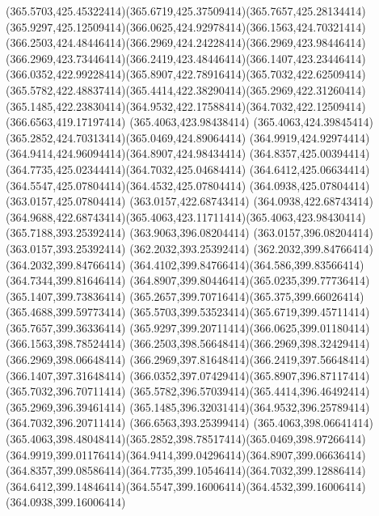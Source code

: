 {{	\curveto(365.5703,425.45322414)(365.6719,425.37509414)(365.7657,425.28134414)
	\curveto(365.9297,425.12509414)(366.0625,424.92978414)(366.1563,424.70321414)
	\curveto(366.2503,424.48446414)(366.2969,424.24228414)(366.2969,423.98446414)
	\curveto(366.2969,423.73446414)(366.2419,423.48446414)(366.1407,423.23446414)
	\curveto(366.0352,422.99228414)(365.8907,422.78916414)(365.7032,422.62509414)
	\curveto(365.5782,422.48837414)(365.4414,422.38290414)(365.2969,422.31260414)
	\curveto(365.1485,422.23830414)(364.9532,422.17588414)(364.7032,422.12509414)
	\lineto(366.6563,419.17197414)
	\closepath
	\moveto(365.4063,423.98438414)
	\curveto(365.4063,424.39845414)(365.2852,424.70313414)(365.0469,424.89064414)
	\curveto(364.9919,424.92974414)(364.9414,424.96094414)(364.8907,424.98434414)
	\curveto(364.8357,425.00394414)(364.7735,425.02344414)(364.7032,425.04684414)
	\curveto(364.6412,425.06634414)(364.5547,425.07804414)(364.4532,425.07804414)
	\lineto(364.0938,425.07804414)
	\lineto(363.0157,425.07804414)
	\lineto(363.0157,422.68743414)
	\lineto(364.0938,422.68743414)
	\curveto(364.9688,422.68743414)(365.4063,423.11711414)(365.4063,423.98430414)
	\closepath
	\moveto(365.7188,393.25392414)
	\lineto(363.9063,396.08204414)
	\lineto(363.0157,396.08204414)
	\lineto(363.0157,393.25392414)
	\lineto(362.2032,393.25392414)
	\lineto(362.2032,399.84766414)
	\lineto(364.2032,399.84766414)
	\curveto(364.4102,399.84766414)(364.586,399.83566414)(364.7344,399.81646414)
	\curveto(364.8907,399.80446414)(365.0235,399.77736414)(365.1407,399.73836414)
	\curveto(365.2657,399.70716414)(365.375,399.66026414)(365.4688,399.59773414)
	\curveto(365.5703,399.53523414)(365.6719,399.45711414)(365.7657,399.36336414)
	\curveto(365.9297,399.20711414)(366.0625,399.01180414)(366.1563,398.78524414)
	\curveto(366.2503,398.56648414)(366.2969,398.32429414)(366.2969,398.06648414)
	\curveto(366.2969,397.81648414)(366.2419,397.56648414)(366.1407,397.31648414)
	\curveto(366.0352,397.07429414)(365.8907,396.87117414)(365.7032,396.70711414)
	\curveto(365.5782,396.57039414)(365.4414,396.46492414)(365.2969,396.39461414)
	\curveto(365.1485,396.32031414)(364.9532,396.25789414)(364.7032,396.20711414)
	\lineto(366.6563,393.25399414)
	\closepath
	\moveto(365.4063,398.06641414)
	\curveto(365.4063,398.48048414)(365.2852,398.78517414)(365.0469,398.97266414)
	\curveto(364.9919,399.01176414)(364.9414,399.04296414)(364.8907,399.06636414)
	\curveto(364.8357,399.08586414)(364.7735,399.10546414)(364.7032,399.12886414)
	\curveto(364.6412,399.14846414)(364.5547,399.16006414)(364.4532,399.16006414)
	\lineto(364.0938,399.16006414)
}}
